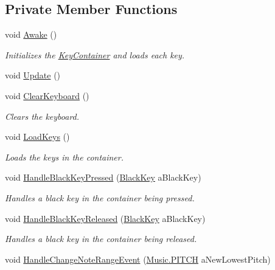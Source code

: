 \subsection*{Private Member Functions}
\begin{DoxyCompactItemize}
\item 
void \hyperlink{group___key_contain_unity_ga9e307b409b1e07b2be51a21afe5d7379}{Awake} ()
\begin{DoxyCompactList}\small\item\em Initializes the \hyperlink{class_key_container}{Key\+Container} and loads each key. \end{DoxyCompactList}\item 
void \hyperlink{group___key_contain_unity_gae0e513a4ef9fd25c1e0f5f3bc53d9b5c}{Update} ()
\item 
void \hyperlink{group___key_contain_priv_func_ga679f5ca9d6b1505180e90ee00bbfe616}{Clear\+Keyboard} ()
\begin{DoxyCompactList}\small\item\em Clears the keyboard. \end{DoxyCompactList}\item 
void \hyperlink{group___key_contain_priv_func_ga65f79700f265d2223681ac95981ab4a3}{Load\+Keys} ()
\begin{DoxyCompactList}\small\item\em Loads the keys in the container. \end{DoxyCompactList}\item 
void \hyperlink{group___key_contain_handlers_ga05cc2543fd9772b26e27bf4f6247ab47}{Handle\+Black\+Key\+Pressed} (\hyperlink{class_black_key}{Black\+Key} a\+Black\+Key)
\begin{DoxyCompactList}\small\item\em Handles a black key in the container being pressed. \end{DoxyCompactList}\item 
void \hyperlink{group___key_contain_handlers_ga5a0c5565c5ebc6026b3122f487e51704}{Handle\+Black\+Key\+Released} (\hyperlink{class_black_key}{Black\+Key} a\+Black\+Key)
\begin{DoxyCompactList}\small\item\em Handles a black key in the container being released. \end{DoxyCompactList}\item 
void \hyperlink{group___key_contain_handlers_ga0d82098e4f886f77a33f9d5ed13fe195}{Handle\+Change\+Note\+Range\+Event} (\hyperlink{group___music_enums_ga508f69b199ea518f935486c990edac1d}{Music.\+P\+I\+T\+CH} a\+New\+Lowest\+Pitch)

\end{DoxyCompactItemize}
